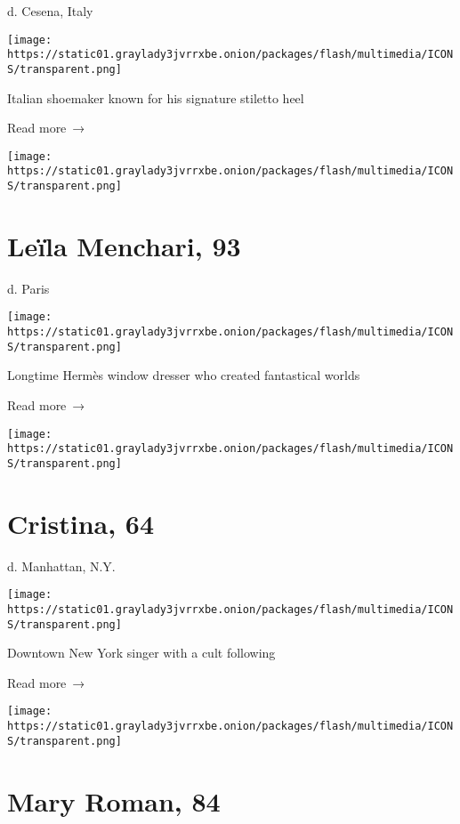 d. Cesena, Italy

\texttt{[image: https://static01.graylady3jvrrxbe.onion/packages/flash/multimedia/ICONS/transparent.png]}

Italian shoemaker known for his signature stiletto heel

 Read more~→

\href{https://www.nytimes3xbfgragh.onion/2020/04/06/obituaries/leila-menchari-dead-coronavirus.html}{}

\texttt{[image: https://static01.graylady3jvrrxbe.onion/packages/flash/multimedia/ICONS/transparent.png]}

\hypertarget{leuxefla-menchari-93}{%
\section{Leïla Menchari, 93}\label{leuxefla-menchari-93}}

d. Paris

\texttt{[image: https://static01.graylady3jvrrxbe.onion/packages/flash/multimedia/ICONS/transparent.png]}

Longtime Hermès window dresser who created fantastical worlds

 Read more~→

\href{https://www.nytimes3xbfgragh.onion/2020/04/05/obituaries/cristina-dead.html}{}

\texttt{[image: https://static01.graylady3jvrrxbe.onion/packages/flash/multimedia/ICONS/transparent.png]}

\hypertarget{cristina-64}{%
\section{Cristina, 64}\label{cristina-64}}

d. Manhattan, N.Y.

\texttt{[image: https://static01.graylady3jvrrxbe.onion/packages/flash/multimedia/ICONS/transparent.png]}

Downtown New York singer with a cult following

 Read more~→

\href{https://www.nytimes3xbfgragh.onion/2020/04/05/obituaries/mary-roman-dead.html}{}

\texttt{[image: https://static01.graylady3jvrrxbe.onion/packages/flash/multimedia/ICONS/transparent.png]}

\hypertarget{mary-roman-84}{%
\section{Mary Roman, 84}\label{mary-roman-84}}

